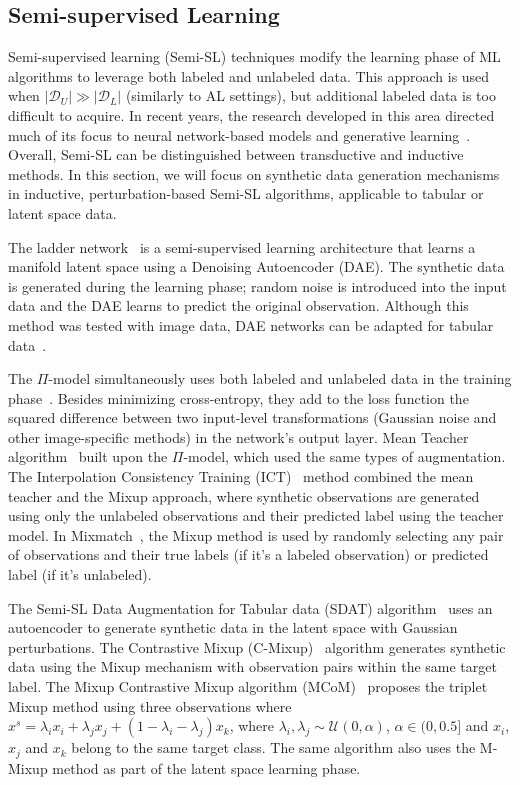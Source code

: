 \subsection{Semi-supervised Learning}\label{sec:semi-supervised-learning}

Semi-supervised learning (Semi-SL) techniques modify the learning phase of ML
algorithms to leverage both labeled and unlabeled data. This approach is used
when $|\mathcal{D}_U| \gg |\mathcal{D}_L|$ (similarly to AL settings), but
additional labeled data is too difficult to acquire. In recent years,
the research developed in this area directed much of its focus to neural
network-based models and generative learning~\cite{van2020survey}. Overall,
Semi-SL can be distinguished between transductive and inductive methods. In
this section, we will focus on synthetic data generation mechanisms in
inductive, perturbation-based Semi-SL algorithms, applicable to tabular or
latent space data.

The ladder network~\cite{rasmus2015semi} is a semi-supervised learning
architecture that learns a manifold latent space using a Denoising
Autoencoder (DAE). The synthetic data is generated during the learning phase;
random noise is introduced into the input data and the DAE learns to predict
the original observation. Although this method was tested with image data,
DAE networks can be adapted for tabular data~\cite{sattarov2022explaining}.

The $\Pi$-model simultaneously uses both labeled and unlabeled data in the
training phase~\cite{samuli2017temporal}. Besides minimizing cross-entropy,
they add to the loss function the squared difference between two input-level
transformations (Gaussian noise and other image-specific methods) in the
network's output layer. Mean Teacher algorithm~\cite{tarvainen2017mean} built
upon the $\Pi$-model, which used the same types of augmentation. The
Interpolation Consistency Training (ICT)~\cite{verma2022interpolation} method
combined the mean teacher and the Mixup approach, where synthetic observations
are generated using only the unlabeled observations and their predicted label
using the teacher model. In Mixmatch~\cite{berthelot2019mixmatch}, the Mixup
method is used by randomly selecting any pair of observations and their true
labels (if it's a labeled observation) or predicted label (if it's unlabeled).

The Semi-SL Data Augmentation for Tabular data (SDAT)
algorithm~\cite{fang2022semi} uses an autoencoder to generate synthetic data
in the latent space with Gaussian perturbations. The Contrastive Mixup
(C-Mixup)~\cite{darabi2021contrastive} algorithm generates synthetic data
using the Mixup mechanism with observation pairs within the same target label.
The Mixup Contrastive Mixup algorithm (MCoM)~\cite{li2022mcom} proposes the
triplet Mixup method using three observations where $x^s = \lambda_ix_i +
\lambda_jx_j + (1-\lambda_i-\lambda_j)x_k$, where $\lambda_i, \lambda_j \sim
\mathcal{U}(0, \alpha)$, $\alpha \in (0, 0.5]$ and $x_i$, $x_j$ and $x_k$
belong to the same target class. The same algorithm also uses the M-Mixup
method as part of the latent space learning phase.


